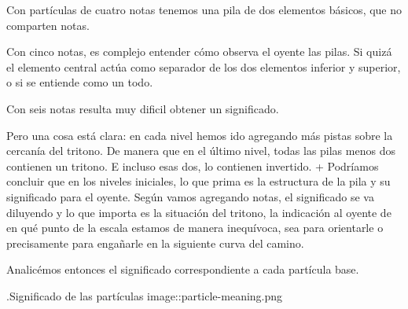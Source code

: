 \documentclass[]{article}
\begin{document}
Con partículas de cuatro notas tenemos una pila de dos elementos básicos, que no comparten notas.

Con cinco notas, es complejo entender cómo observa el oyente las pilas. Si quizá el elemento central actúa como separador de los dos elementos inferior y superior, o si se entiende como un todo.

Con seis notas resulta muy dificil obtener un significado.

Pero una cosa está clara: en cada nivel hemos ido agregando más pistas sobre la cercanía del tritono. De manera que en el último nivel, todas las pilas menos dos contienen un tritono. E incluso esas dos, lo contienen invertido. + Podríamos concluir que en los niveles iniciales, lo que prima es la estructura de la pila y su significado para el oyente. Según vamos agregando notas, el significado se va diluyendo y lo que importa es la situación del tritono, la indicación al oyente de en qué punto de la escala estamos de manera inequívoca, sea para orientarle o precisamente para engañarle en la siguiente curva del camino.

Analicémos entonces el significado correspondiente a cada partícula base.

.Significado de las partículas image::particle-meaning.png
\end{document}
